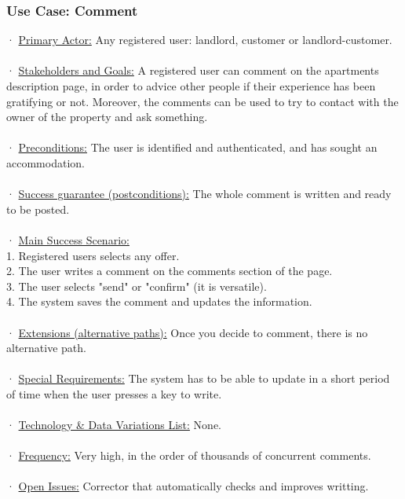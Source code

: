 \documentclass[12pt]{article}
\begin{document}
{\subsubsection{Use Case: Comment}
· \underline{Primary Actor:} Any registered user: landlord, customer or landlord-customer.\\\\
· \underline{Stakeholders and Goals:} A registered user can comment on the apartments description page, in order to advice other people if their experience has been gratifying or not. Moreover, the comments can be used to try to contact with the owner of the property and ask something.\\\\
· \underline{Preconditions:} The user is identified and authenticated, and has sought an accommodation.\\\\
· \underline{Success guarantee (postconditions):} The whole comment is written and ready to be posted.\\\\
· \underline{Main Success Scenario:}\\
1. Registered users selects any offer.\\
2. The user writes a comment on the comments section of the page.\\
3. The user selects "send" or "confirm" (it is versatile).\\
4. The system saves the comment and updates the information.\\\\
· \underline{Extensions (alternative paths):} Once you decide to comment, there is no alternative path.\\\\
· \underline{Special Requirements:} The system has to be able to update in a short period of time when the user presses a key to write.\\\\
· \underline{Technology \& Data Variations List:} None.\\\\
· \underline{Frequency:} Very high, in the order of thousands of concurrent comments.\\\\
· \underline{Open Issues:} Corrector that automatically checks and improves writting.\\\\


}
\end{document}
